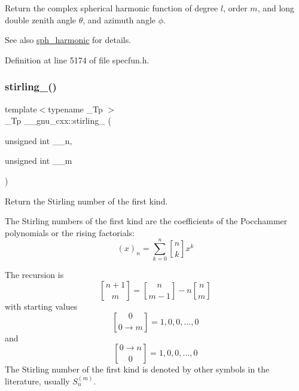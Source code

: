Return the complex spherical harmonic function of degree $ l $, order $ m $, and {\ttfamily long double} zenith angle $ \theta $, and azimuth angle $ \phi $.

\begin{DoxySeeAlso}{See also}
\hyperlink{group__gnu__math__spec__func_gacbff28988d5d36f0c3b3fe03d4f57896}{sph\+\_\+harmonic} for details. 
\end{DoxySeeAlso}


Definition at line 5174 of file specfun.\+h.

\mbox{\label{group__gnu__math__spec__func_ga2b955dac7d2c5125f2091eaeb25c8ad2}} 
\subsubsection{\texorpdfstring{stirling\+\_()}{stirling\_1()}\hspace{0.1cm}{\footnotesize\ttfamily [1/2]}}
{\footnotesize\ttfamily template$<$typename \+\_\+\+Tp $>$ \\
\+\_\+\+Tp \+\_\+\+\_\+gnu\+\_\+cxx\+::stirling\+\_ (\begin{DoxyParamCaption}\item[{unsigned int}]{\+\_\+\+\_\+n,  }\item[{unsigned int}]{\+\_\+\+\_\+m }\end{DoxyParamCaption})\hspace{0.3cm}{\ttfamily [inline]}}

Return the Stirling number of the first kind.

The Stirling numbers of the first kind are the coefficients of the Pocchammer polynomials or the rising factorials\+: \[ (x)_n = \sum_{k=0}^{n} \genfrac{[}{]}{0pt}{0}{n}{k} x^k \]

The recursion is \[ \genfrac{[}{]}{0pt}{0}{n+1}{m} = \genfrac{[}{]}{0pt}{0}{n}{m-1} - n \genfrac{[}{]}{0pt}{0}{n}{m} \] with starting values \[ \genfrac{[}{]}{0pt}{0}{0}{0\rightarrow m} = {1, 0, 0, ..., 0} \] and \[ \genfrac{[}{]}{0pt}{0}{0\rightarrow n}{0} = {1, 0, 0, ..., 0} \] The Stirling number of the first kind is denoted by other symbols in the literature, usually $ S_n^{(m)} $. 

